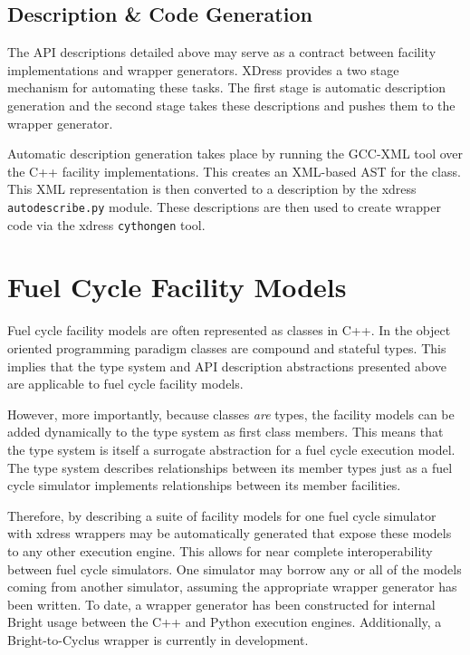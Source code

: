 \documentclass{ansconfpaper}
\newcommand{\vin}[1]{\texttt{{#1}}}
\begin{document}
\subsection{Description \& Code Generation}
\label{sec:autodesc}

The API descriptions detailed above may serve as a contract between facility 
implementations and wrapper generators.  XDress provides a two stage mechanism 
for automating these tasks.  The first stage is automatic description generation 
and the second stage takes these descriptions and pushes them to the wrapper 
generator.  

Automatic description generation takes place by running the GCC-XML
tool \cite{gccxml} over the C++ facility implementations.  This creates an XML-based
AST for the class.  This XML representation \cite{xml} is then converted to a 
description by the xdress \vin{autodescribe.py} module.  These descriptions are
then used to create wrapper code via the xdress \vin{cythongen} tool.


\section{Fuel Cycle Facility Models}
\label{sec:fc}

Fuel cycle facility models are often represented as classes in C++. In the object
oriented programming paradigm classes are compound and stateful types.  This implies 
that the type system and API description abstractions presented above are applicable
to fuel cycle facility models.  

However, more importantly, because classes \emph{are} types, the facility models 
can be added dynamically to the type system as first class members.  This means
that the type system is itself a surrogate abstraction for a fuel cycle execution 
model.  The type system describes relationships between its member types just as 
a fuel cycle simulator implements relationships between its member facilities.

Therefore, by describing a suite of facility models for one fuel cycle simulator with
xdress wrappers may be automatically generated that expose these models to any
other execution engine.  This allows for near complete interoperability between 
fuel cycle simulators.  One simulator may borrow any or all of the models coming 
from another simulator, assuming the appropriate wrapper generator has been written.
To date, a wrapper generator has been constructed for internal Bright usage between
the C++ and Python execution engines.  Additionally, a Bright-to-Cyclus wrapper is 
currently in development.
\end{document}
